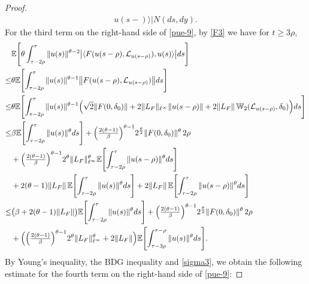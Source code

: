 \documentclass[11pt]{article}
\numberwithin{equation}{section}
\theoremstyle{plain}
\begin{document}
\begin{proof}
\begin{align}
 	                                     u(s-)
 	                           \big\rangle
 	  \Big| N(ds,dy) .
 \end{align}
 For the third term on the right-hand side of \eqref{pue-9}, 
 by \eqref{F3} we have for $t\ge 3\rho$,
 \begin{align}
 	& \mathbb{E}\Biggl[
 	\theta \int_{\tau - 2\rho}^{\tau}  \|u(s)\|^{\theta-2}
 	\bigl|
 	\langle F(u(s-\rho), \mathcal{L}_{u(s-\rho)}), u(s) \rangle 
 	\bigr| ds
 	\Biggr]
 	\nonumber \\
 	\le & \theta 
 	\mathbb{E}\Biggl[
 	\int_{\tau - 2\rho}^{\tau}
 	\|u(s)\|^{\theta-1}
 	\bigl\|F(u(s-\rho),\mathcal{L}_{u(s-\rho)})\bigr\|
 	ds\Biggr]
 	\nonumber \\
 	\le &
 	\theta \mathbb{E}\Biggl[
 	\int_{\tau - 2\rho}^{\tau} 
 	\|u(s)\|^{\theta-1}
 	\Bigl(
 \sqrt{2}	\|F(0,\delta_0)\|
 	+2 \|L_{F}\|_{\ell^\infty} \|u(s-\rho)\|
 	+2 \|L_{F}\|\, \mathbb{W}_2(\mathcal{L}_{u(s-\rho)}, \delta_0) 
 	\Bigr) ds
 	\Biggr]
 	\nonumber \\
 	\le &
 	\beta  
 	\mathbb{E}\Biggl[
 	\int_{\tau - 2\rho}^{\tau} \|u(s)\|^{\theta} ds \Biggr]
 	+ \Bigl( \tfrac{2(\theta - 1)}{\beta} \Bigr)^{\theta - 1}
 2^{\frac{\theta}{2}}	\|F(0,\delta_0)\|^{\theta}\,2\rho
 	\nonumber \\
 	& + \Bigl( \tfrac{2(\theta - 1)}{\beta} \Bigr)^{\theta - 1}
 2^{\theta}	\|L_{F}\|_{\ell^\infty}^{\theta}
 	\mathbb{E}\Biggl[
 	\int_{\tau - 2\rho}^{\tau} \|u(s-\rho)\|^{\theta} ds
 	\Biggr]
 	\nonumber \\
 	& + 2 (\theta-1)\|L_F\| \,
 	\mathbb{E}\Biggl[
 	\int_{\tau - 2\rho}^{\tau} \|u(s)\|^{\theta} ds \Biggr]
 	+ 2\|L_F\| \,
 	\mathbb{E}\Biggl[
 	\int_{\tau - 2\rho}^{\tau} \|u(s-\rho)\|^{\theta} ds \Biggr]
 	\nonumber \\
 	\le &
 	\bigl(\beta + 2(\theta -1)\|L_F\|\bigr)
 	\mathbb{E}\Biggl[
 	\int_{\tau - 2\rho}^{\tau} \|u(s)\|^{\theta} ds \Biggr]
    + \Bigl( \tfrac{2(\theta - 1)}{\beta} \Bigr)^{\theta - 1}2^{\frac{\theta}{2}}
 	\|F(0,\delta_0)\|^{\theta}\, 2\rho
 	\nonumber \\
 	& + \Bigl(
 	\Bigl( \tfrac{2(\theta - 1)}{\beta} \Bigr)^{\theta - 1}
 2^{\theta}	\|L_{F}\|_{\ell^\infty}^{\theta}
 	+2 \|L_{F}\|
 	\Bigr)
 	\mathbb{E}\Biggl[
 	\int_{\tau - 3\rho}^{\tau - \rho} \|u(s)\|^{\theta} ds \Biggr] .
 \end{align}
 By Young's inequality,
 the BDG inequality
 and 
 \eqref{sigma3},  
 we obtain the following
 estimate for the fourth term on the right-hand side of \eqref{pue-9}:

\end{proof}
\end{document}
